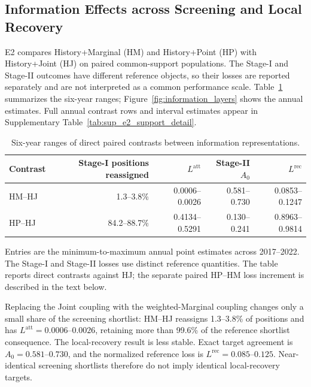 \subsection{Information Effects across Screening and Local Recovery}
\label{subsec:results_information}

E2 compares History+Marginal (HM) and History+Point (HP) with History+Joint (HJ) on paired common-support populations. The Stage-I and Stage-II outcomes have different reference objects, so their losses are reported separately and are not interpreted as a common performance scale. Table~\ref{tab:information_decision_summary} summarizes the six-year ranges; Figure~\ref{fig:information_layers} shows the annual estimates. Full annual contrast rows and interval estimates appear in Supplementary Table~\ref{tab:sup_e2_support_detail}.

\begin{table}[pos=t]
\centering
\caption{Six-year ranges of direct paired contrasts between information representations.}
\label{tab:information_decision_summary}
\small
\setlength{\tabcolsep}{4pt}
\begin{tabular}{lrrrr}
\toprule
Contrast & Stage-I positions reassigned & $L^{\mathrm{att}}$ & Stage-II $A_0$ & $L^{\mathrm{rec}}$ \\
\midrule
HM--HJ & 1.3--3.8\% & 0.0006--0.0026 & 0.581--0.730 & 0.0853--0.1247 \\
HP--HJ & 84.2--88.7\% & 0.4134--0.5291 & 0.130--0.241 & 0.8963--0.9814 \\
\bottomrule
\end{tabular}
\par\vspace{3pt}
\begin{minipage}{0.98\linewidth}
\footnotesize
Entries are the minimum-to-maximum annual point estimates across 2017--2022. The Stage-I and Stage-II losses use distinct reference quantities. The table reports direct contrasts against HJ; the separate paired HP--HM loss increment is described in the text below.
\end{minipage}
\end{table}

Replacing the Joint coupling with the weighted-Marginal coupling changes only a small share of the screening shortlist: HM--HJ reassigns 1.3--3.8\% of positions and has $L^{\mathrm{att}}=0.0006$--$0.0026$, retaining more than 99.6\% of the reference shortlist consequence. The local-recovery result is less stable. Exact target agreement is $A_0=0.581$--$0.730$, and the normalized reference loss is $L^{\mathrm{rec}}=0.085$--$0.125$. Near-identical screening shortlists therefore do not imply identical local-recovery targets.

